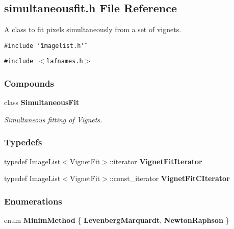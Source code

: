 \subsection{simultaneousfit.h File Reference}
\label{simultaneousfit_h}
A class to fit pixels simultaneously from a set of vignets. 


{\tt \#include \char`\"{}imagelist.h\char`\"{}}\par
{\tt \#include $<$lafnames.h$>$}\par
\subsubsection*{Compounds}
\begin{CompactItemize}
\item 
class {\bf Simultaneous\-Fit}
\begin{CompactList}\small\item\em Simultaneous fitting of Vignets.\item\end{CompactList}\end{CompactItemize}
\subsubsection*{Typedefs}
\begin{CompactItemize}
\item 
{}
typedef Image\-List$<$Vignet\-Fit$>$::iterator {\bf Vignet\-Fit\-Iterator}\label{simultaneousfit_h_a4}

\item 
{}
typedef Image\-List$<$Vignet\-Fit$>$::const\_\-iterator {\bf Vignet\-Fit\-CIterator}\label{simultaneousfit_h_a5}

\end{CompactItemize}
\subsubsection*{Enumerations}
\begin{CompactItemize}
\item 
enum {\bf Minim\-Method} \{ {\bf Levenberg\-Marquardt}, 
{\bf Newton\-Raphson}
 \}
\end{CompactItemize}
